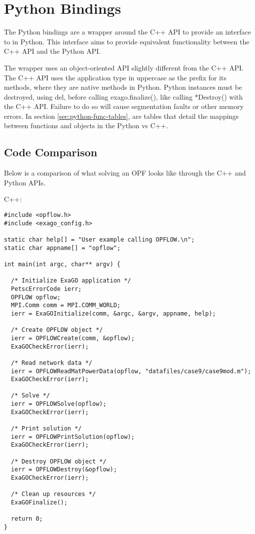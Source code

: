 \chapter{Python Bindings}\label{chap:python}

The \exago Python bindings are a wrapper around the C++ API to provide an interface to \exago in Python. This interface aims to provide equivalent functionality between the \exago C++ API and the Python API.

The wrapper uses an object-oriented API slightly different from the C++ API. The C++ API uses the application type in uppercase as the prefix for its methods, where they are native methods in Python. \exago Python instances must be destroyed, using del, before calling exago.finalize(), like calling *Destroy() with the C++ API.  Failure to do so will cause segmentation faults or other memory errors. In section \ref{sec:python-func-tables}, are tables that detail the mappings between functions and objects in the Python vs C++.

\section{Code Comparison}\label{sec:python-code-comp}

Below is a comparison of what solving an OPF looks like through the C++ and Python APIs.

C++:

\begin{lstlisting}
#include <opflow.h>
#include <exago_config.h>

static char help[] = "User example calling OPFLOW.\n";
static char appname[] = "opflow";

int main(int argc, char** argv) {

  /* Initialize ExaGO application */
  PetscErrorCode ierr;
  OPFLOW opflow;
  MPI.Comm comm = MPI.COMM_WORLD;
  ierr = ExaGOInitialize(comm, &argc, &argv, appname, help);

  /* Create OPFLOW object */
  ierr = OPFLOWCreate(comm, &opflow);
  ExaGOCheckError(ierr);

  /* Read network data */
  ierr = OPFLOWReadMatPowerData(opflow, "datafiles/case9/case9mod.m");
  ExaGOCheckError(ierr);

  /* Solve */
  ierr = OPFLOWSolve(opflow);
  ExaGOCheckError(ierr);

  /* Print solution */
  ierr = OPFLOWPrintSolution(opflow);
  ExaGOCheckError(ierr);

  /* Destroy OPFLOW object */
  ierr = OPFLOWDestroy(&opflow);
  ExaGOCheckError(ierr);

  /* Clean up resources */
  ExaGOFinalize();

  return 0;
}
\end{lstlisting}

